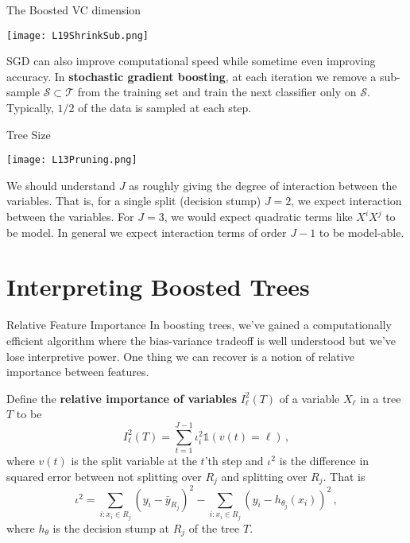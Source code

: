 \documentclass[10pt, table, dvipsnames,xcdraw, handout]{beamer}
\newcommand{\cT}{\ensuremath{\mathcal{T}}}
\begin{document}
 \begin{frame}[fragile]{The Boosted VC dimension}
   \begin{minipage}[t][0.5\textheight][t]{\textwidth}
	\centering \texttt{[image: L19ShrinkSub.png]} 
  \end{minipage}
  \vfill
\begin{minipage}[t][0.5\textheight][t]{\textwidth}
SGD can also improve computational speed while sometime even improving accuracy. In \textbf{stochastic gradient boosting}, at each iteration we remove a sub-sample $\mathcal{S}\subset\cT$  from the training set and train the next classifier only on $\mathcal{S}$. \pause Typically, $1/2$ of the data is sampled at each step.
\end{minipage}
\end{frame}




 \begin{frame}[fragile]{Tree Size}
   \begin{minipage}[t][0.5\textheight][t]{\textwidth}
	\centering \texttt{[image: L13Pruning.png]} 
  \end{minipage}
  \vfill
\begin{minipage}[t][0.5\textheight][t]{\textwidth}
We should understand $J$ as roughly giving the degree of interaction between the variables. That is, for a single split (decision stump) $J=2$, we expect interaction between the variables. \pause For $J=3$, we would expect quadratic terms like $X^iX^j$ to be model. In general we expect interaction terms of order $J-1$ to be model-able. 
\end{minipage}
\end{frame}






\section{Interpreting Boosted Trees}



 \begin{frame}[fragile]{Relative Feature Importance }
In boosting trees, we've gained a computationally efficient algorithm where the bias-variance tradeoff is well understood but we've lose interpretive power. One thing we can recover is a notion of relative importance between features.\pause

Define the \textbf{relative importance of variables} $I^2_\ell(T)$ of a variable $X_\ell$ in a tree $T$ to be 
$$
I^2_\ell(T) = \sum_{t = 1}^{J-1}\iota^2_i \mathds{1}(v(t)=\ell)\,,
$$\pause
where $v(t)$ is the split variable at the $t$'th step and $\iota^2$ is the difference in squared error between not splitting over $R_j$ and splitting over $R_j$. \pause That is
$$
\iota^2 = \sum_{i:x_i\in R_j} (y_i - \bar{y}_{R_j})^2 - \sum_{i:x_i\in R_j} (y_i - h_{\theta_j}(x_i))^2 \,,
$$
where $h_\theta$ is the decision stump at $R_j$ of the tree $T$.
\end{frame}
\end{document}
